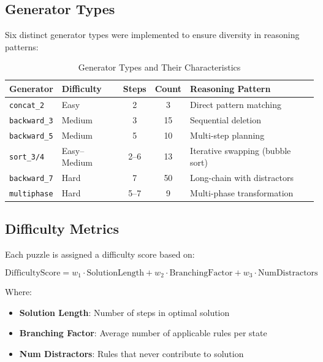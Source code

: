 \documentclass[11pt,a4paper]{article}
\begin{document}
\subsection{Generator Types}

Six distinct generator types were implemented to ensure diversity in reasoning patterns:

\begin{table}[H]
\centering
\caption{Generator Types and Their Characteristics}
\begin{tabular}{llccp{5cm}}
\toprule
\textbf{Generator} & \textbf{Difficulty} & \textbf{Steps} & \textbf{Count} & \textbf{Reasoning Pattern} \\
\midrule
\texttt{concat\_2} & Easy & 2 & 3 & Direct pattern matching \\
\texttt{backward\_3} & Medium & 3 & 15 & Sequential deletion \\
\texttt{backward\_5} & Medium & 5 & 10 & Multi-step planning \\
\texttt{sort\_3/4} & Easy--Medium & 2--6 & 13 & Iterative swapping (bubble sort) \\
\texttt{backward\_7} & Hard & 7 & 50 & Long-chain with distractors \\
\texttt{multiphase} & Hard & 5--7 & 9 & Multi-phase transformation \\
\bottomrule
\end{tabular}
\end{table}

\subsection{Difficulty Metrics}

Each puzzle is assigned a difficulty score based on:

\begin{equation}
\text{DifficultyScore} = w_1 \cdot \text{SolutionLength} + w_2 \cdot \text{BranchingFactor} + w_3 \cdot \text{NumDistractors}
\end{equation}

Where:
\begin{itemize}
    \item \textbf{Solution Length}: Number of steps in optimal solution
    \item \textbf{Branching Factor}: Average number of applicable rules per state
    \item \textbf{Num Distractors}: Rules that never contribute to solution
\end{itemize}
\end{document}
